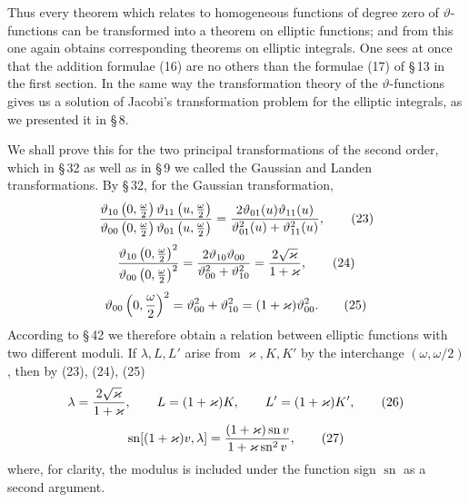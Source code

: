 \documentclass[11pt]{article}
\providecommand{\tht}{\vartheta}
\providecommand{\sn}{\operatorname{sn}}
\begin{document}
Thus every theorem which relates to homogeneous functions of degree zero of $\vartheta$-functions can be transformed into a theorem on elliptic functions; and from this one again obtains corresponding theorems on elliptic integrals. One sees at once that the addition formulae (16) are no others than the formulae (17) of \S\,13 in the first section. In the same way the transformation theory of the $\vartheta$-functions gives us a solution of Jacobi's transformation problem for the elliptic integrals, as we presented it in \S\,8.

We shall prove this for the two principal transformations of the second order, which in \S\,32 as well as in \S\,9 we called the Gaussian and Landen transformations. By \S\,32, for the Gaussian transformation,
\begin{equation}
{\tht_{10}\left(0,{\omega\over2}\right)\tht_{11}\left(u,{\omega\over2}\right)
\over
\tht_{00}\left(0,{\omega\over2}\right)\tht_{01}\left(u,{\omega\over2}\right)}
={2\tht_{01}(u)\tht_{11}(u)
\over \tht_{01}^{2}(u)+\tht_{11}^{2}(u)},
\tag{23}
\end{equation}
\begin{equation}
{\tht_{10}\left(0,{\omega\over2}\right)^2
\over
\tht_{00}\left(0,{\omega\over2}\right)^2}
={2\tht_{10}\tht_{00}\over\tht_{00}^{2}+\tht_{10}^{2}}
={2\sqrt\varkappa\over1+\varkappa},
\tag{24}
\end{equation}
\begin{equation}
\tht_{00}\left(0,{\omega\over2}\right)^2=\tht_{00}^{2}+\tht_{10}^{2}=(1+\varkappa)\tht_{00}^{2}.
\tag{25}
\end{equation}
According to \S\,42 we therefore obtain a relation between elliptic functions with two different moduli. If $\lambda,L,L'$ arise from $\varkappa,K,K'$ by the interchange $(\omega,\omega/2)$, then by (23), (24), (25)
\begin{equation}
\lambda={2\sqrt\varkappa\over1+\varkappa},
\qquad
L=(1+\varkappa)K,
\qquad
L'=(1+\varkappa)K',
\tag{26}
\end{equation}
\begin{equation}
\sn[(1+\varkappa)v,\lambda]=
{(1+\varkappa)\sn v
\over 1+\varkappa\sn^2v},
\tag{27}
\end{equation}
where, for clarity, the modulus is included under the function sign $\sn$ as a second argument.
\end{document}
